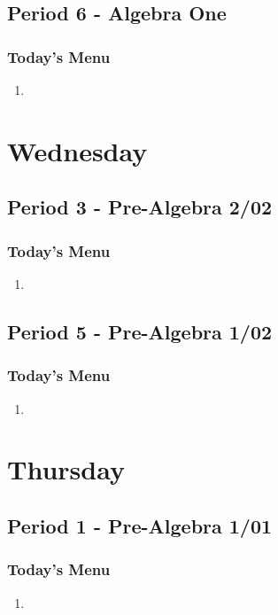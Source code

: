    	 \subsection[ALG1]{Period 6 - Algebra One}
   	   \begin{frame}[label=ALG1]
   	   	 \frametitle{Today's Menu}

          \begin{enumerate}
   	   	   \item
   	   	   \rightarrowitem
   	     \end{enumerate}
   	   	 
   	   	\end{frame}
   	 
   	 \section[Wed]{Wednesday}
   	 \subsection[PA2/02]{Period 3 - Pre-Algebra 2/02}
      \begin{frame}[label=PA2_02]
   	 	\frametitle{Today's Menu}
   	 	
   	 	 \begin{enumerate}
   	   	   \item
   	   	   \rightarrowitem
   	     \end{enumerate}
   	 	 
   	 	\end{frame}	 	   
   	 	
 \subsection[PA1/02]{Period 5 - Pre-Algebra 1/02}
      \begin{frame}[label=PA1_02]
      	\frametitle{Today's Menu}
          
           \begin{enumerate}
   	   	   \item
   	   	   \rightarrowitem
   	     \end{enumerate}
   	     	      
     \end{frame}
		 
   	 \section[Thu]{Thursday}
 \subsection[PA1/01]{Period 1 - Pre-Algebra 1/01}
 \begin{frame}[label=PA1_01]
  	\frametitle{Today's Menu}

      \begin{enumerate}
   	   	   \item
   	   	   \rightarrowitem
   	  \end{enumerate}
 
 	 \end{frame}
 
